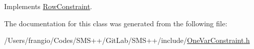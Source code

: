 Implements \mbox{\hyperlink{class_s_m_spp__di__unipi__it_1_1_row_constraint_a42d5ec40966a094c7fa805a5ea44337b}{Row\+Constraint}}.



The documentation for this class was generated from the following file\+:\begin{DoxyCompactItemize}
\item 
/\+Users/frangio/\+Codes/\+S\+M\+S++/\+Git\+Lab/\+S\+M\+S++/include/\mbox{\hyperlink{_one_var_constraint_8h}{One\+Var\+Constraint.\+h}}\end{DoxyCompactItemize}
